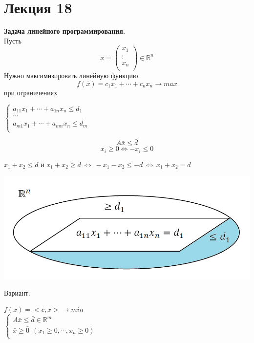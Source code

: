 \documentclass[12pt]{article}
\theoremstyle{definition}
\numberwithin{equation}{section}
\begin{document}
	\section *{Лекция 18}
	\noindent\textbf{Задача линейного программирования.}\\
	Пусть \[\bar x=\begin{pmatrix}
	x_1\\
	\vdots\\
	x_n\\
	\end{pmatrix} \in \mathbb{R}^n\]
	Нужно максимизировать линейную функцию $$f(\bar x)=c_1x_1+\cdots +c_nx_n \to max $$ при ограничениях
	\begin{center}
		$
		\left\{
		\begin{array}{lcl}
		a_{11}x_1+\cdots +a_{1n}x_n \leqslant d_1\\
		\cdots\\
		a_{m1}x_1+\cdots +a_{mn}x_n \leqslant d_m\\
		\end{array}
		\right.
		$
	\end{center}
	$$A\bar x \leqslant \bar d$$
	$$x_i \geqslant 0 \Leftrightarrow -x_i \leqslant 0$$
	\begin{center}
		$x_1+x_2 \leqslant d$ и $x_1+x_2 \geqslant d~\Leftrightarrow~-x_1-x_2\leqslant -d~\Leftrightarrow~x_1+x_2=d$
	\end{center}
	\begin{center}
		\includegraphics[scale=0.6]{l18_1.png}\\
	\end{center}
	Вариант:
	\begin{center}
		$f(\bar x)=<\bar c, \bar x> \to min$\\
		$
		\left\{
		\begin{array}{lcl}
		A\bar x \leqslant \bar d \in \mathbb{R}^m\\
		\bar x \geqslant \bar 0 ~~(x_1\geqslant 0, \cdots, x_n \geqslant 0)\\
		\end{array}
		\right.
		$
	\end{center}
\end{document}

